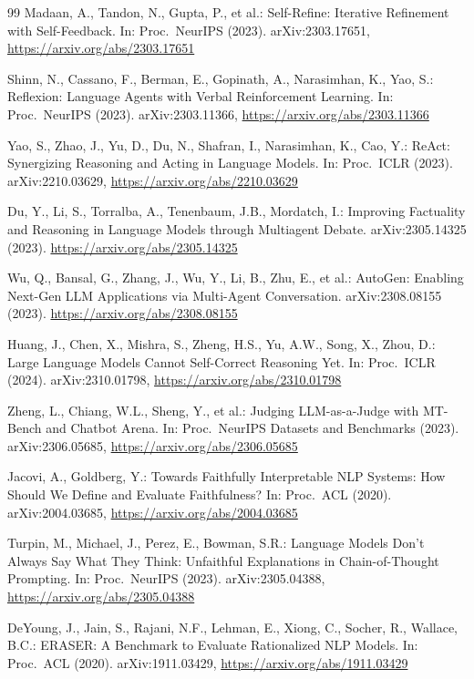 \documentclass[runningheads]{llncs}
\begin{document}
\begin{thebibliography}{99}
Madaan, A., Tandon, N., Gupta, P., et al.: Self-Refine: Iterative Refinement with Self-Feedback. In: Proc.\ NeurIPS (2023). arXiv:2303.17651, \url{https://arxiv.org/abs/2303.17651}

Shinn, N., Cassano, F., Berman, E., Gopinath, A., Narasimhan, K., Yao, S.: Reflexion: Language Agents with Verbal Reinforcement Learning. In: Proc.\ NeurIPS (2023). arXiv:2303.11366, \url{https://arxiv.org/abs/2303.11366}

Yao, S., Zhao, J., Yu, D., Du, N., Shafran, I., Narasimhan, K., Cao, Y.: ReAct: Synergizing Reasoning and Acting in Language Models. In: Proc.\ ICLR (2023). arXiv:2210.03629, \url{https://arxiv.org/abs/2210.03629}

Du, Y., Li, S., Torralba, A., Tenenbaum, J.B., Mordatch, I.: Improving Factuality and Reasoning in Language Models through Multiagent Debate. arXiv:2305.14325 (2023). \url{https://arxiv.org/abs/2305.14325}

Wu, Q., Bansal, G., Zhang, J., Wu, Y., Li, B., Zhu, E., et al.: AutoGen: Enabling Next-Gen LLM Applications via Multi-Agent Conversation. arXiv:2308.08155 (2023). \url{https://arxiv.org/abs/2308.08155}

Huang, J., Chen, X., Mishra, S., Zheng, H.S., Yu, A.W., Song, X., Zhou, D.: Large Language Models Cannot Self-Correct Reasoning Yet. In: Proc.\ ICLR (2024). arXiv:2310.01798, \url{https://arxiv.org/abs/2310.01798}

Zheng, L., Chiang, W.L., Sheng, Y., et al.: Judging LLM-as-a-Judge with MT-Bench and Chatbot Arena. In: Proc.\ NeurIPS Datasets and Benchmarks (2023). arXiv:2306.05685, \url{https://arxiv.org/abs/2306.05685}

Jacovi, A., Goldberg, Y.: Towards Faithfully Interpretable NLP Systems: How Should We Define and Evaluate Faithfulness? In: Proc.\ ACL (2020). arXiv:2004.03685, \url{https://arxiv.org/abs/2004.03685}

Turpin, M., Michael, J., Perez, E., Bowman, S.R.: Language Models Don't Always Say What They Think: Unfaithful Explanations in Chain-of-Thought Prompting. In: Proc.\ NeurIPS (2023). arXiv:2305.04388, \url{https://arxiv.org/abs/2305.04388}

DeYoung, J., Jain, S., Rajani, N.F., Lehman, E., Xiong, C., Socher, R., Wallace, B.C.: ERASER: A Benchmark to Evaluate Rationalized NLP Models. In: Proc.\ ACL (2020). arXiv:1911.03429, \url{https://arxiv.org/abs/1911.03429}


\end{thebibliography}
\end{document}
